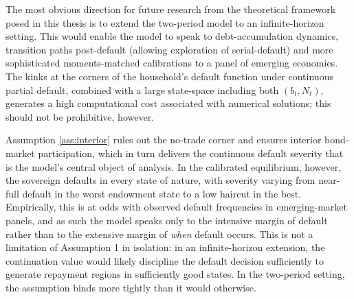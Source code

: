 \documentclass[11pt]{article}
\theoremstyle{definition}
\theoremstyle{plain}
\theoremstyle{remark}
\begin{document}

The most obvious direction for future research from the theoretical framework posed in this thesis is to extend the two-period model to an infinite-horizon setting. This would enable the model to speak to debt-accumulation dynamics, transition paths post-default (allowing exploration of serial-default) and more sophisticated moments-matched calibrations to a panel of emerging economies. The kinks at the corners of the household's default function under continuous partial default, combined with a large state-space including both $(b_t,N_t)$, generates a high computational cost associated with numerical solutions; this should not be prohibitive, however.

Assumption \ref{ass:interior} rules out the no-trade corner and ensures interior bond-market participation, which in turn delivers the continuous default severity that is the model's central object of analysis. In the calibrated equilibrium, however, the sovereign defaults in every state of nature, with severity varying from near-full default in the worst endowment state to a low haircut in the best. Empirically, this is at odds with observed default frequencies in emerging-market panels, and as such the model speaks only to the intensive margin of default rather than to the extensive margin of \textit{when} default occurs. This is not a limitation of Assumption 1 in isolation: in an infinite-horizon extension, the continuation value would likely discipline the default decision sufficiently to generate repayment regions in sufficiently good states. In the two-period setting, the assumption binds more tightly than it would otherwise.
\end{document}
